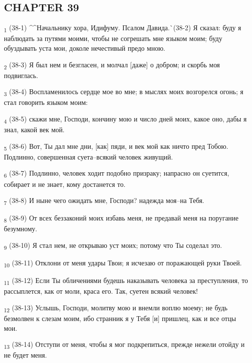 \subsection{CHAPTER 39}
\begin{tcolorbox}
\textsubscript{1} (38-1) ^^Начальнику хора, Идифуму. Псалом Давида.^^ (38-2) Я сказал: буду я наблюдать за путями моими, чтобы не согрешать мне языком моим; буду обуздывать уста мои, доколе нечестивый предо мною.
\end{tcolorbox}
\begin{tcolorbox}
\textsubscript{2} (38-3) Я был нем и безгласен, и молчал [даже] о добром; и скорбь моя подвиглась.
\end{tcolorbox}
\begin{tcolorbox}
\textsubscript{3} (38-4) Воспламенилось сердце мое во мне; в мыслях моих возгорелся огонь; я стал говорить языком моим:
\end{tcolorbox}
\begin{tcolorbox}
\textsubscript{4} (38-5) скажи мне, Господи, кончину мою и число дней моих, какое оно, дабы я знал, какой век мой.
\end{tcolorbox}
\begin{tcolorbox}
\textsubscript{5} (38-6) Вот, Ты дал мне дни, [как] пяди, и век мой как ничто пред Тобою. Подлинно, совершенная суета--всякий человек живущий.
\end{tcolorbox}
\begin{tcolorbox}
\textsubscript{6} (38-7) Подлинно, человек ходит подобно призраку; напрасно он суетится, собирает и не знает, кому достанется то.
\end{tcolorbox}
\begin{tcolorbox}
\textsubscript{7} (38-8) И ныне чего ожидать мне, Господи? надежда моя--на Тебя.
\end{tcolorbox}
\begin{tcolorbox}
\textsubscript{8} (38-9) От всех беззаконий моих избавь меня, не предавай меня на поругание безумному.
\end{tcolorbox}
\begin{tcolorbox}
\textsubscript{9} (38-10) Я стал нем, не открываю уст моих; потому что Ты соделал это.
\end{tcolorbox}
\begin{tcolorbox}
\textsubscript{10} (38-11) Отклони от меня удары Твои; я исчезаю от поражающей руки Твоей.
\end{tcolorbox}
\begin{tcolorbox}
\textsubscript{11} (38-12) Если Ты обличениями будешь наказывать человека за преступления, то рассыплется, как от моли, краса его. Так, суетен всякий человек!
\end{tcolorbox}
\begin{tcolorbox}
\textsubscript{12} (38-13) Услышь, Господи, молитву мою и внемли воплю моему; не будь безмолвен к слезам моим, ибо странник я у Тебя [и] пришлец, как и все отцы мои.
\end{tcolorbox}
\begin{tcolorbox}
\textsubscript{13} (38-14) Отступи от меня, чтобы я мог подкрепиться, прежде нежели отойду и не будет меня.
\end{tcolorbox}
